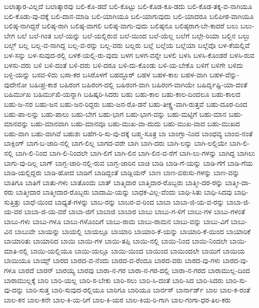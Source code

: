 {ಬಲಾತ್ಕಾರ-ವಿಲ್ಲದೆ
ಬಲಾತ್ಕಾರವು
ಬಲಿ-ಕೊ-ಡದೆ
ಬಲಿ-ಕೊಟ್ಟು
ಬಲಿ-ಕೊಡ-ಕೂ-ಡದು
ಬಲಿ-ಕೊಡ-ತಕ್ಕ-ವ-ನಾಗಿಯೂ
ಬಲಿ-ಕೊಡು-ವು-ದಕ್ಕೆ
ಬಲಿ-ದಾನ-ಮಾಡಿ
ಬಲಿ-ಯಾಗಿಯೂ
ಬಲಿ-ಯಾಗುವುದು
ಬಲಿ-ಯಾದರೂ
ಬಲಿಪೀಠ-ವಾಗಿಯೂ
ಬಲಿಷ್ಠ-ನಾಗಿದ್ದರೆ
ಬಲಿಷ್ಠ-ರಾಗಿ
ಬಲಿಷ್ಠ-ವಾಗಲಿ
ಬಲಿಷ್ಠ-ವಾಗು-ವುದು
ಬಲಿಷ್ಠನೂ
ಬಲಿಷ್ಠರಾಗ-ಬೇ-ಕಾದರೆ
ಬಲು
ಬಲು-ಬೇಗ
ಬಲೆ
ಬಲೆ-ಗಿಂತ
ಬಲೆ-ಯನ್ನು
ಬಲೆ-ಯಲ್ಲಿರುವ
ಬಲೆ-ಯಿಂದ
ಬಲೆ-ಯೆಲ್ಲ
ಬಲೆಗೆ
ಬಲ್ಗೇ-ರಿಯಾ
ಬಲ್ಬಿನ
ಬಲ್ಬು
ಬಲ್ಬ್
ಬಲ್ಲ
ಬಲ್ಲ-ವ-ನಾಗಿದ್ದ
ಬಲ್ಲ-ವ-ರನ್ನು
ಬಲ್ಲ-ವರು
ಬಲ್ಲರು
ಬಲ್ಲೆ
ಬಲ್ಲೆಯ
ಬಲ್ಲೆಯಾ
ಬಲ್ಲೆವೊ
ಬಳ-ಕೆಯಲ್ಲಿವೆ
ಬಳ-ಸನ್ನು
ಬಳ-ಸುವುದ-ರಲ್ಲಿ
ಬಳಕೆ-ಯಲ್ಲಿ-ರು-ವುದು
ಬಳಗ
ಬಳಗ-ವನ್ನೇ
ಬಳಲಿ
ಬಳಸಿ
ಬಳಸಿ-ಕೊಂಡರೆ
ಬಳಸಿ-ರುವ
ಬಳಸು-ವರು
ಬಳಿ
ಬಳಿ-ದಂತೆ
ಬಳಿ-ದರು
ಬಳಿ-ದರೂ
ಬಳಿ-ದು-ಕೊಂಡು
ಬಳಿ-ಯ-ಬೇಕೊ
ಬಳಿಗೆ
ಬಳಿಗೇ
ಬಳಿದು
ಬಳ್ಳಿ-ಯನ್ನು
ಬಸವ-ಳಿದು
ಬಸಾ-ಕರ
ಬಸಿರೊಳಗೆ
ಬಹದ್ದೂರ್
ಬಹಳ
ಬಹಳ-ಕಾಲ
ಬಹಳ-ವಾಗಿ
ಬಹಳ-ವೆನ್ನು-ವುದೇನೋ
ಬಹಿಃಪ್ರ-ಕಾಶ
ಬಹಿರಂಗ
ಬಹಿರಂಗ-ದಲ್ಲಿ
ಬಹಿರಂಗ-ವಾಗಿ
ಬಹಿರಂಗ-ವಾಗಿಯೇ
ಬಹಿರ್ದೃಷ್ಟಿ-ಯಾ-ದಂತೆ
ಬಹಿರ್ಮುಖ
ಬಹಿರ್ಮುಖಿ-ಯನ್ನಾಗಿ
ಬಹಿಷ್ಕರಿ-ಸಿದರು
ಬಹು
ಬಹು-ಕಾಲ
ಬಹು-ಕಾಲ-ದಿಂದಲೂ
ಬಹು-ಕಾಲದ
ಬಹು-ಜ-ನರ
ಬಹು-ಜನ
ಬಹು-ಜನ-ರಿದ್ದರು
ಬಹು-ಜನ-ರೊ-ಡನೆ
ಬಹು-ತೀಕ್ಷ್ಣ-ವಾಗಿ-ರುತ್ತವೆ
ಬಹು-ದೂರ-ದಿಂದ
ಬಹು-ಪಾ-ಲನ್ನು
ಬಹು-ಪಾಲು
ಬಹು-ಬೇಗ
ಬಹು-ಭಾಗ
ಬಹು-ಭಾಗ-ವನ್ನು
ಬಹು-ಮಟ್ಟಿಗೆ
ಬಹು-ಮಾನ
ಬಹು-ಮಾನವನ್ನು
ಬಹು-ಮಾನವಾಗಿ
ಬಹು-ಮಾನವೂ
ಬಹು-ಮುಖ-ವಾ-ದುದು
ಬಹು-ಮುಖ-ವಾದ
ಬಹು-ಮುಖದ
ಬಹು-ವಾಗಿ
ಬಹು-ವಾಗಿವೆ
ಬಹುಶಃ
ಬಹೆಗ-ರಿ-ಸು-ವು-ದಕ್ಕೆ
ಬಹ್ಮ-ಸೂತ್ರ
ಬಾ
ಬಾಂಗ್ಲಾ-ನಿಂದ
ಬಾಂಧವ್ಯ
ಬಾಂಬಿ-ನಂತೆ
ಬಾಕ್ಸಿಂಗ್
ಬಾಗ-ಬ-ಜಾರಿ-ನಲ್ಲಿ
ಬಾಗ-ಲಿಲ್ಲ
ಬಾಗದ-ವರೇ
ಬಾಗಿ
ಬಾಗಿ-ದರು
ಬಾಗಿ-ಲನ್ನು
ಬಾಗಿ-ಲಲ್ಲಿಯೇ
ಬಾಗಿ-ಲಿ-ನಲ್ಲಿ
ಬಾಗಿ-ಲಿ-ನಿಂದ
ಬಾಗಿ-ಲಿ-ನಿಂದಲೇ
ಬಾಗಿ-ಲಿಗೆ
ಬಾಗಿ-ಲಿನ
ಬಾಗಿ-ಲಿನ-ವ-ರೆಗೆ
ಬಾಗಿ-ಲು-ಗಳನ್ನು
ಬಾಗಿದ್ದ
ಬಾಗಿಲು
ಬಾಗು-ವು-ದಿಲ್ಲ
ಬಾಗ್
ಬಾಗ್ಬ-ಜಾರಿ-ನಲ್ಲಿ-ರುವ
ಬಾಗ್ಬ-ಜಾರಿನ
ಬಾಚಿ
ಬಾಡಿ
ಬಾಡಿ-ಗೆ-ಯನ್ನು
ಬಾಡಿ-ಗೆಗೆ
ಬಾಡಿ-ಗೆಯ
ಬಾಡಿ-ಯಲ್ಲಿದ್ದರು
ಬಾಡಿ-ಹೋದ
ಬಾಡಿಗೆ
ಬಾಡಿದ್ದಂತೆ
ಬಾಡ್ಲಿಯನ್
ಬಾಣ
ಬಾಣ-ಬಿರುಸು-ಗಳನ್ನು
ಬಾಣ-ವನ್ನು
ಬಾತಿಗೂ
ಬಾತಿಗೆ
ಬಾತು-ಗಳು
ಬಾತೊಂದು
ಬಾತ್
ಬಾತ್ಮಿದಾರ
ಬಾತ್ಮಿದಾರ-ರೊಬ್ಬರು
ಬಾತ್ಮೀ-ದರ-ರನ್ನು
ಬಾತ್ಮೀ-ದಾ-ರರು
ಬಾತ್ಮೀದಾರ
ಬಾತ್ಮೀದಾರ-ರೊಬ್ಬರು
ಬಾದಾಮಿ-ಯನ್ನು
ಬಾಧಕ-ವಿಲ್ಲ-ವೆಂದು
ಬಾಧಿ-ಸಿತು
ಬಾಧಿ-ಸಿದವು
ಬಾಧಿ-ಸುತ್ತಿತ್ತು
ಬಾಧೆ-ಯಿಂದ
ಬಾಧ್ಯತೆ-ಗಳನ್ನು
ಬಾಬ-ರನ್ನು
ಬಾಬರ-ವ-ರಿಂದ
ಬಾಬಾ
ಬಾಬಾ-ಜಿ-ಯ-ವ-ರನ್ನು
ಬಾಬಾ-ಜಿ-ಯ-ವರ
ಬಾಬಾ-ಜಿ-ಯ-ವರೆ
ಬಾಬಾ-ಜಿಗೆ
ಬಾಬಾಜಿ
ಬಾಬಾರ
ಬಾಬು
ಬಾಬು-ಗ-ಳಿಗೆ
ಬಾಬು-ಗಳ
ಬಾಬು-ಗಳಂತೆ
ಬಾಬು-ಗಳು
ಬಾಬು-ಗಳೂ
ಬಾಬು-ಗಳೊಂದಿಗೆ
ಬಾಬು-ರಾಮ
ಬಾಬು-ರಾಮನ
ಬಾಬು-ವನ್ನು
ಬಾಬು-ವಿಗೆ
ಬಾಬು-ವಿನ
ಬಾಬುವೇ
ಬಾಯನ್ನು
ಬಾಯಲ್ಲಿ
ಬಾಯಲ್ಲೂ
ಬಾಯಾರಿ
ಬಾಯಾರಿ-ಕೆ-ಯನ್ನು
ಬಾಯಾರಿ-ಕೆ-ಯಿಂದ
ಬಾಯಾರಿಕೆ
ಬಾಯಾರಿತು
ಬಾಯಾರಿದ
ಬಾಯಿ
ಬಾಯಿ-ಗಳ
ಬಾಯಿ-ತಪ್ಪಿ
ಬಾಯಿ-ನಲ್ಲಿ
ಬಾಯಿ-ನಿಂದ
ಬಾಯಿ-ನಿಂದಲೇ
ಬಾಯಿ-ಮಾತಿ-ನಲ್ಲಿ
ಬಾಯಿ-ಯಲ್ಲಿಯೂ
ಬಾಯಿ-ಯಲ್ಲೂ
ಬಾಯಿ-ಯಿಂದ
ಬಾಯಿಂದ
ಬಾಯಿಂದಲೇ
ಬಾಯಿಗೆ
ಬಾಯಿಯ
ಬಾಯಿಯೂ
ಬಾಯ್ಸ್
ಬಾರದ
ಬಾರದ-ವ-ನೆಂದು
ಬಾರದ-ವ-ರೆಂದೂ
ಬಾರದ-ವರು
ಬಾರದ-ವು-ಗಳು
ಬಾರದ-ವು-ಗಳೂ
ಬಾರದೆ
ಬಾರನ್
ಬಾರಯ್ಯ
ಬಾರವು
ಬಾರಾ-ನ-ಗರ
ಬಾರಾ-ನ-ಗರ-ದಲ್ಲಿ
ಬಾರಾ-ನ-ಗರದ
ಬಾರಾಮುಲ್ಲ-ದಿಂದ
ಬಾರಾಮುಲ್ಲಕ್ಕೆ
ಬಾರಿ
ಬಾರಿ-ಯಲ್ಲ
ಬಾರಿ-ಸ-ಬೇಕು
ಬಾರಿ-ಸಲು
ಬಾರಿ-ಸಿ-ದಂತೆ
ಬಾರಿ-ಸಿದ
ಬಾರಿ-ಸಿದರು
ಬಾರಿ-ಸು-ವು-ದನ್ನು
ಬಾರಿ-ಸುತ್ತ
ಬಾರಿ-ಸುವುದ-ರಲ್ಲಿಯೂ
ಬಾರಿಗೂ
ಬಾರಿಯೂ
ಬಾರ್ನಸ್
ಬಾರ್ನಾರ್ಡ್
ಬಾಲ
ಬಾಲ-ಕ-ರಂತೆ
ಬಾಲ-ಕನ
ಬಾಲ-ಕನೇ
ಬಾಲ-ಕಿ-ಯ-ರಿಗೆ
ಬಾಲ-ಕಿ-ಯರ
ಬಾಲ-ಕಿಯ-ರಿ-ಗಾಗಿ
ಬಾಲ-ಗಂಗಾ-ಧರ-ತಿಲ-ಕರು
}
